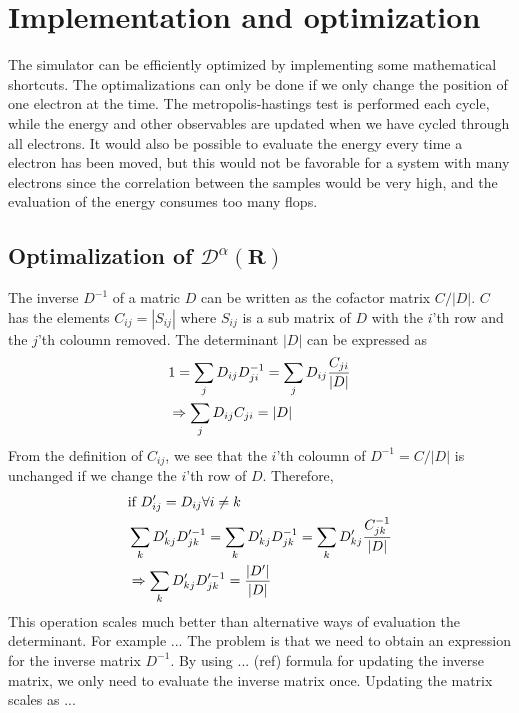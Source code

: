 \documentclass[a4paper,10pt,twocolumn]{article} %
\newcommand{\ts}[1]{\textbf{#1}}
\begin{document}
\section{Implementation and optimization}%

The simulator can be efficiently optimized by implementing some mathematical shortcuts. The optimalizations can only be done if we only change the position of one electron at the time.
The metropolis-hastings test is performed each cycle, while the energy and other observables are updated when we have cycled through all electrons. It would also be possible to
evaluate the energy every time a electron has been moved, but this would not be favorable for a system with many electrons since the correlation between the samples would be very high, 
and the evaluation of the energy consumes too many flops. 


\subsection{Optimalization of $\mathcal D^\alpha(\ts R)$} %

The inverse $D^{-1}$ of a matric $D$ can be written as the cofactor matrix $C/|D|$. $C$ has the elements $C_{ij}=|S_{ij}|$ where $S_{ij}$ is a sub matrix of $D$ with the $i$'th row and the 
$j$'th coloumn removed. The determinant $|D|$ can be expressed as 
\begin{align}
	&1=\sum_j D_{ij}D^{-1}_{ji}=\sum_jD_{ij}\frac{C_{ji}}{|D|}\notag\\
	&\Rightarrow \sum_jD_{ij}C_{ji}=|D|
\end{align}
From the definition of $C_{ij}$, we see that the $i$'th coloumn of $D^{-1}=C/|D|$ is unchanged if we change the $i$'th row of $D$.
Therefore,
\begin{align}
	&\text{if } D'_{ij}=D_{ij} \forall i\neq k\notag\\
	&\sum_k D'_{kj} D'^{-1}_{jk} = \sum_k D'_{kj} D^{-1}_{jk} = \sum_k D'_{kj} \frac{C^{-1}_{jk}}{|D|}\notag\\ 
	&\Rightarrow \sum_k D'_{kj} D'^{-1}_{jk} = \frac{|D'|}{|D|}\label{eqDet}
\end{align}
This operation scales much better than alternative ways of evaluation the determinant. For example ... 
The problem is that we need to obtain an expression for the inverse matrix $D^{-1}$. By using ... (ref) formula for updating the inverse
matrix, we only need to evaluate the inverse matrix once. Updating the matrix scales as ...
\end{document}
